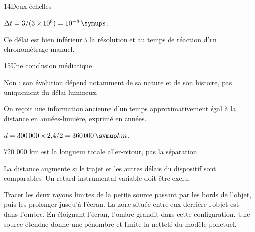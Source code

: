 \par\noindent\begin{minipage}{\linewidth}
\begin{corrige}{14}{Deux échelles}
\begin{questions}
\item $\Delta t=3/(3\times10^8)=10^{-8}\unite s$.
\item Ce délai est bien inférieur à la résolution et au temps de réaction d’un chronométrage manuel.
\end{questions}
\end{corrige}
\end{minipage}
\par\noindent\begin{minipage}{\linewidth}
\begin{corrige}{15}{Une conclusion médiatique}
\begin{questions}
\item Non : son évolution dépend notamment de sa nature et de son histoire, pas uniquement du délai lumineux.
\item On reçoit une information ancienne d’un temps approximativement égal à la distance en années-lumière, exprimé en années.
\end{questions}
\end{corrige}
\end{minipage}
\clearpage
\par\noindent\begin{minipage}{\linewidth}
\label{cor-defi-16}\begin{questions}
\item $d=300\,000\times2{,}4/2=360\,000\unite{km}$.
\item 720 000 km est la longueur totale aller-retour, pas la séparation.
\item La distance augmente si le trajet et les autres délais du dispositif sont comparables. Un retard instrumental variable doit être exclu.
\end{questions}
\end{minipage}
\par\noindent\begin{minipage}{\linewidth}
\label{cor-activite-16}
Tracer les deux rayons limites de la petite source passant par les bords de l’objet, puis les prolonger jusqu’à l’écran. La zone située entre eux derrière l’objet est dans l’ombre. En éloignant l’écran, l’ombre grandit dans cette configuration. Une source étendue donne une pénombre et limite la netteté du modèle ponctuel.\par\end{minipage}
